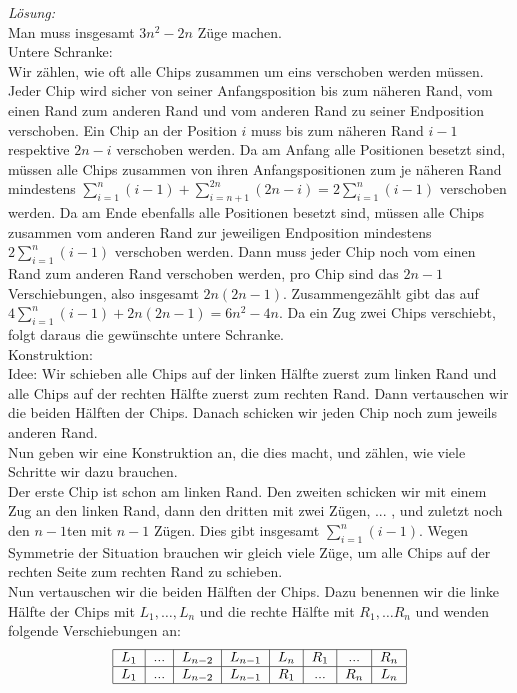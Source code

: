 \documentclass[12pt,a4paper]{article}
\theoremstyle{plain}
\theoremstyle{definition}
\theoremstyle{remark}
\begin{document}
\begin{enumerate}
\textit{Lösung:}\\
Man muss insgesamt $3n^2-2n$ Züge machen.\\
Untere Schranke:\\
Wir zählen, wie oft alle Chips zusammen um eins verschoben werden müssen.\\
Jeder Chip wird sicher von seiner Anfangsposition bis zum näheren Rand, vom einen Rand zum anderen Rand und vom anderen Rand zu seiner Endposition verschoben. Ein Chip an der Position $i$ muss bis zum näheren Rand $i-1$ respektive $2n-i$ verschoben werden. Da am Anfang alle Positionen besetzt sind, müssen alle Chips zusammen von ihren Anfangspositionen zum je näheren Rand mindestens $\sum_{i=1}^n (i-1)+\sum_{i=n+1}^{2n} (2n-i)=2 \sum_{i=1}^n (i-1)$ verschoben werden. Da am Ende ebenfalls alle Positionen besetzt sind, müssen alle Chips zusammen vom anderen Rand zur jeweiligen Endposition mindestens $2 \sum_{i=1}^n (i-1)$ verschoben werden. Dann muss jeder Chip noch vom einen Rand zum anderen Rand verschoben werden, pro Chip sind das $2n-1$ Verschiebungen, also insgesamt $2n(2n-1)$. Zusammengezählt gibt das auf $4 \sum_{i=1}^n (i-1)+2n(2n-1)=6n^2-4n$. Da ein Zug zwei Chips verschiebt, folgt daraus die gewünschte untere Schranke.\\
Konstruktion:\\
Idee: Wir schieben alle Chips auf der linken Hälfte zuerst zum linken Rand und alle Chips auf der rechten Hälfte zuerst zum rechten Rand. Dann vertauschen wir die beiden Hälften der Chips. Danach schicken wir jeden Chip noch zum jeweils anderen Rand.\\
Nun geben wir eine Konstruktion an, die dies macht, und zählen, wie viele Schritte wir dazu brauchen.\\
Der erste Chip ist schon am linken Rand. Den zweiten schicken wir mit einem Zug an den linken Rand, dann den dritten mit zwei Zügen, ... , und zuletzt noch den $n-1$ten mit $n-1$ Zügen. Dies gibt insgesamt $\sum_{i=1}^n (i-1)$. Wegen Symmetrie der Situation brauchen wir gleich viele Züge, um alle Chips auf der rechten Seite zum rechten Rand zu schieben.\\
Nun vertauschen wir die beiden Hälften der Chips. Dazu benennen wir die linke Hälfte der Chips mit $L_1, \dots, L_n$ und die rechte Hälfte mit $R_1, \dots R_n$ und wenden folgende Verschiebungen an:
\[
\begin{tabular}{|c|c|c|c|c|c|c|c|}\hline
$L_1 $&$ ...$&$ L_{n-2}$&$L_{n-1}$&$L_n $&$R_1$&$...$&$R_n$ \\ \hline
$L_1$&$...$&$L_{n-2}$&$L_{n-1}$&$R_1$&$...$&$R_n$&$L_n $\\ \hline

\end{tabular}\]
\end{enumerate}
\end{document}
